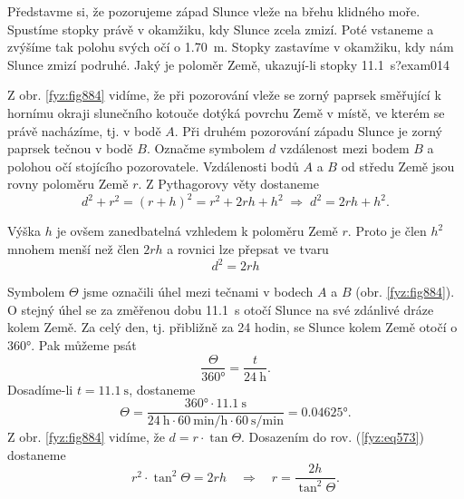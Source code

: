 \begin{fyzexam}{Představme si, že pozorujeme západ Slunce vleže na břehu klidného moře. Spustíme
  stopky právě v okamžiku, kdy Slunce zcela zmizí. Poté vstaneme a zvýšíme tak polohu svých očí o
  \SI{1.70}{\m}. Stopky zastavíme v okamžiku, kdy nám Slunce zmizí podruhé. Jaký je poloměr Země,
  ukazují-li stopky \SI{11.1}{\s}?}{exam014}

  {\centering\captionsetup{type=figure}\par}

  Z obr. \ref{fyz:fig884} vidíme, že při pozorování vleže se zorný paprsek směřující k hornímu
  okraji slunečního kotouče dotýká povrchu Země v místě, ve kterém se právě nacházíme, tj. v bodě
  \(A\). Při druhém pozorování západu Slunce je zorný paprsek tečnou v bodě \(B\). Označme symbolem
  \(d\) vzdálenost mezi bodem \(B\) a polohou očí stojícího pozorovatele. Vzdálenosti bodů \(A\) a
  \(B\) od středu Země jsou rovny poloměru Země \(r\). Z Pythagorovy věty dostaneme
  \begin{equation*}
    d^2 + r^2 = (r + h)^2 = r^2 + 2rh + h^2\;\Rightarrow\; d^2 = 2rh + h^2.
  \end{equation*}

  Výška \(h\) je ovšem zanedbatelná vzhledem k poloměru Země \(r\). Proto je člen \(h^2\) mnohem
  menší než člen \(2rh\) a rovnici lze přepsat ve tvaru
  \begin{equation}\label{fyz:eq573}
    d^2 = 2rh
  \end{equation}

  Symbolem \(\varTheta\) jsme označili úhel mezi tečnami v bodech \(A\) a \(B\) (obr.
  \ref{fyz:fig884}). O stejný úhel se za změřenou dobu \SI{11.1}{\s} otočí Slunce na své zdánlivé
  dráze kolem Země. Za celý den, tj. přibližně za \num{24} hodin, se Slunce kolem Země otočí o
  \ang{360}. Pak můžeme psát
  \begin{equation*}
    \dfrac{\varTheta}{\ang{360}} = \dfrac{t}{\SI{24}{\hour}}.
  \end{equation*}
  Dosadíme-li \(t = \SI{11.1}{\s}\), dostaneme
  \begin{equation*}
    \varTheta = \dfrac{\ang{360}\cdot\SI{11.1}{\s}}
                      {\SI{24}{\hour}\cdot\SI{60}{\minute\per\hour}\cdot\SI{60}{\s\per\minute}}
              =\ang{0.04625}.
  \end{equation*}
  Z obr. \ref{fyz:fig884} vidíme, že \(d = r\cdot\tan{\varTheta}\). Dosazením do rov.
  (\ref{fyz:eq573}) dostaneme
  \begin{equation}\label{fyz:eq574}
    r^2\cdot\tan^2{\varTheta} = 2rh\quad\Rightarrow\quad 
    r = \dfrac{2h}{\tan^2{\varTheta}}.
  \end{equation}


\end{fyzexam}
